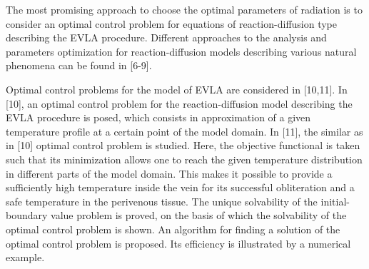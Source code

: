 \documentclass[10pt]{article}
\begin{document}
The most promising approach to choose the optimal parameters of radiation is to consider an optimal control problem for equations of reaction-diffusion type describing the EVLA procedure. Different approaches to the analysis and parameters optimization for reaction-diffusion models describing various natural phenomena can be found in [6-9].

Optimal control problems for the model of EVLA are considered in [10,11]. In [10], an optimal control problem for the reaction-diffusion model describing the EVLA procedure is posed, which consists in approximation of a given temperature profile at a certain point of the model domain. In [11], the similar as in [10] optimal control problem is studied. Here, the objective functional is taken such that its minimization allows one to reach the given temperature distribution in different parts of the model domain. This makes it possible to provide a sufficiently high temperature inside the vein for its successful obliteration and a safe temperature in the perivenous tissue. The unique solvability of the initial-boundary value problem is proved, on the basis of which the solvability of the optimal control problem is shown. An algorithm for finding a solution of the optimal control problem is proposed. Its efficiency is illustrated by a numerical example.
\end{document}
